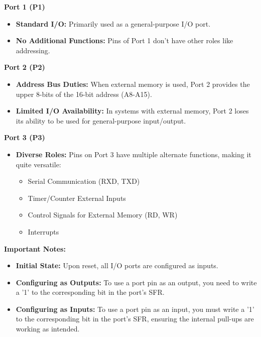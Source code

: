 \documentclass[
]{article}
\begin{document}
\textbf{Port 1 (P1)}

\begin{itemize}
\item
  \textbf{Standard I/O:} Primarily used as a general-purpose I/O port.
\item
  \textbf{No Additional Functions:} Pins of Port 1 don't have other
  roles like addressing.
\end{itemize}

\textbf{Port 2 (P2)}

\begin{itemize}
\item
  \textbf{Address Bus Duties:} When external memory is used, Port 2
  provides the upper 8-bits of the 16-bit address (A8-A15).
\item
  \textbf{Limited I/O Availability:} In systems with external memory,
  Port 2 loses its ability to be used for general-purpose input/output.
\end{itemize}

\textbf{Port 3 (P3)}

\begin{itemize}
\item
  \textbf{Diverse Roles:} Pins on Port 3 have multiple alternate
  functions, making it quite versatile:

  \begin{itemize}
  \item
    Serial Communication (RXD, TXD)
  \item
    Timer/Counter External Inputs
  \item
    Control Signals for External Memory (RD, WR)
  \item
    Interrupts
  \end{itemize}
\end{itemize}

\textbf{Important Notes:}

\begin{itemize}
\item
  \textbf{Initial State:} Upon reset, all I/O ports are configured as
  inputs.
\item
  \textbf{Configuring as Outputs:} To use a port pin as an output, you
  need to write a '1' to the corresponding bit in the port's SFR.
\item
  \textbf{Configuring as Inputs:} To use a port pin as an input, you
  must write a '1' to the corresponding bit in the port's SFR, ensuring
  the internal pull-ups are working as intended.
\end{itemize}
\end{document}
